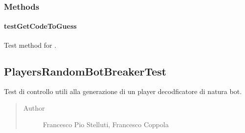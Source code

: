 \documentclass[letterpaper,10pt,italian,openany,oneside]{sphinxmanual}
\begin{document}
\subsubsection{Methods}
\label{\detokenize{test/it/unicam/cs/pa/mastermind/test/PlayersInteractiveMakerTest:methods}}

\paragraph{testGetCodeToGuess}
\label{\detokenize{test/it/unicam/cs/pa/mastermind/test/PlayersInteractiveMakerTest:testgetcodetoguess}}

\begin{fulllineitems}
\label{\detokenize{test/it/unicam/cs/pa/mastermind/test/PlayersInteractiveMakerTest:it.unicam.cs.pa.mastermind.test.PlayersInteractiveMakerTest.testGetCodeToGuess()}}
Test method for .

\end{fulllineitems}



\subsection{PlayersRandomBotBreakerTest}
\label{\detokenize{test/it/unicam/cs/pa/mastermind/test/PlayersRandomBotBreakerTest:playersrandombotbreakertest}}\label{\detokenize{test/it/unicam/cs/pa/mastermind/test/PlayersRandomBotBreakerTest::doc}}

\begin{fulllineitems}
\label{\detokenize{test/it/unicam/cs/pa/mastermind/test/PlayersRandomBotBreakerTest:it.unicam.cs.pa.mastermind.test.PlayersRandomBotBreakerTest}}
Test di controllo utili alla generazione di un player decodficatore di natura bot.
\begin{quote}\begin{description}
\item[{Author}] \leavevmode
Francesco Pio Stelluti, Francesco Coppola

\end{description}\end{quote}

\end{fulllineitems}
\end{document}
